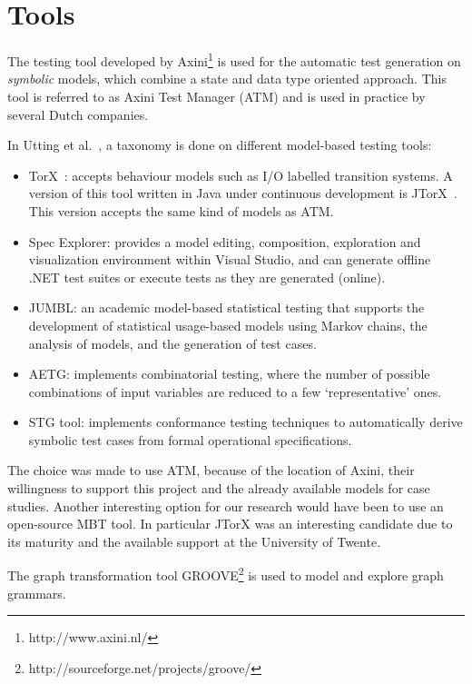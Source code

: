 \section{Tools}
The testing tool developed by Axini\footnote{http://www.axini.nl/} is used for the automatic test generation on \textit{symbolic} models, which combine a state and data type oriented approach. This tool is referred to as Axini Test Manager (ATM) and is used in practice by several Dutch companies.

In Utting et al.~\cite{Utting:MBTTaxonomy}, a taxonomy is done on different model-based testing tools:
\begin{itemize}
  \item TorX~\cite{Tretmans:TorX}: accepts behaviour models such as I/O labelled transition systems. A version of this tool written in Java under continuous development is JTorX~\cite{Belinfante:JTorX}. This version accepts the same kind of models as ATM.
  \item Spec Explorer\cite{Veanes:SpecExplorer}: provides a model editing, composition, exploration and visualization environment within Visual Studio, and can generate offline .NET test suites or execute tests as they are generated (online).
  \item JUMBL\cite{Prowell:JUMBL}: an academic model-based statistical testing that supports the development of statistical usage-based models using Markov chains, the analysis of models, and the generation of test cases.
  \item AETG\cite{Cohen:AETG}: implements combinatorial testing, where the number of possible combinations of input variables are reduced to a few `representative' ones.
  \item STG tool\cite{clarke:STG}: implements conformance testing techniques to automatically derive symbolic test cases from formal operational specifications.
\end{itemize}

The choice was made to use ATM, because of the location of Axini, their willingness to support this project and the already available models for case studies. Another interesting option for our research would have been to use an open-source MBT tool. In particular JTorX was an interesting candidate due to its maturity and the available support at the University of Twente.

The graph transformation tool GROOVE\footnote{http://sourceforge.net/projects/groove/} is used to model and explore graph grammars.

